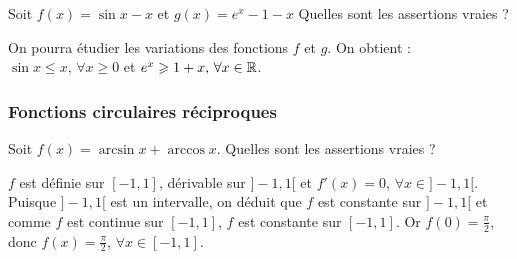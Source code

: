 \begin{question} 
Soit   $f(x)= \sin x -x$ et $g(x)= e^x-1-x$  Quelles sont les assertions vraies ?

\begin{answers}



\end{answers}
\begin{explanations}
On pourra étudier les variations des fonctions $f$ et $g$. On obtient :  $\sin x \le x, \, \forall x\ge 0$ et $e^x \geqslant 1+x, \, \forall x\in \mathbb{R}$.
\end{explanations}


\end{question}



\subsubsection{Fonctions circulaires réciproques}



\begin{question} 
Soit $f(x)=\arcsin x + \arccos x$.  Quelles sont les assertions vraies ?

\begin{answers}



\end{answers}
\begin{explanations}
$f$ est définie sur $[-1,1]$,  dérivable sur $]-1,1[$  et $f'(x)=0$, $\forall x \in ]-1,1[$. Puisque $]-1,1[$ est un intervalle, on déduit que $f$ est constante sur $]-1,1[$ et comme $f$ est continue sur $[-1,1]$, $f$ est constante sur $[-1,1]$. Or $f(0)=\frac{\pi}{2}$, donc $f(x)=\frac{\pi}{2}, \, \forall x \in [-1,1]$.
\end{explanations}


\end{question}


